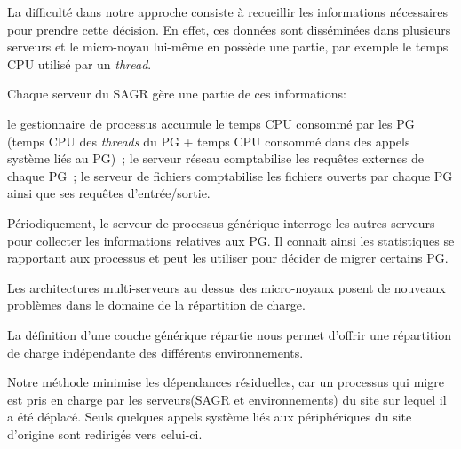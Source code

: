 \documentclass[11pt,a4paper]{article}
\begin{document}
La difficulté dans notre approche consiste à recueillir les informations
nécessaires pour prendre cette décision. En effet, ces données sont
disséminées dans plusieurs serveurs et
le micro-noyau lui-même en possède une partie, par exemple le temps CPU utilisé par
un {\em thread}.

Chaque serveur du SAGR gère une partie de ces informations:
\begin{itemize}
\myitem le gestionnaire de processus accumule le temps CPU consommé par les
PG (temps CPU des {\em threads} du PG + temps CPU consommé dans des appels
système liés au PG)~;
\myitem le serveur réseau comptabilise les requ\^etes externes de chaque PG~;
\myitem le serveur de fichiers comptabilise les fichiers ouverts par chaque PG
ainsi que ses requ\^etes d'entrée/sortie.
\end{itemize}
Périodiquement, le serveur de processus générique
interroge les autres serveurs pour collecter les informations relatives aux PG.
Il connait ainsi les statistiques se rapportant aux processus et peut les utiliser pour décider de migrer certains PG.

Les architectures multi-serveurs au dessus des micro-noyaux posent de nouveaux
problèmes dans le domaine de la répartition de charge.

La définition d'une couche générique répartie nous permet d'offrir une 
répartition de charge indépendante des différents environnements.

Notre méthode minimise les dépendances résiduelles, car un 
processus qui migre est pris en charge par les serveurs(SAGR et
environnements) du site sur lequel il a été déplacé. Seuls quelques
appels système liés aux périphériques du site d'origine sont 
redirigés vers celui-ci.



\end{document}
